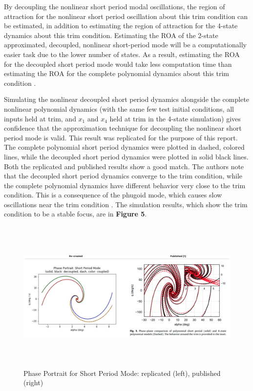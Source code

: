 \documentclass[%
 reprint,
 amsmath,amssymb,
 aps,
]{revtex4-2}
\begin{document}
By decoupling the nonlinear short period modal oscillations, the region of attraction for the nonlinear short period oscillation about this trim condition can be estimated, in addition to estimating the region of attraction for the 4-state dynamics about this trim condition. Estimating the ROA of the 2-state approximated, decoupled, nonlinear short-period mode will be a computationally easier task due to the lower number of states. As a result, estimating the ROA for the decoupled short period mode would take less computation time than estimating the ROA for the complete polynomial dynamics about this trim condition \cite{primary}.

Simulating the nonlinear decoupled short period dynamics alongside the complete nonlinear polynomial dynamics (with the same few test initial conditions, all inputs held at trim, and $x_1$ and $x_4$ held at trim in the 4-state simulation) gives confidence that the approximation technique for decoupling the nonlinear short period mode is valid. This result was replicated for the purpose of this report. The complete polynomial short period dynamics were plotted in dashed, colored lines, while the decoupled short period dynamics were plotted in solid black lines. Both the replicated and published results show a good match. The authors note that the decoupled short period dynamics converge to the trim condition, while the complete polynomial dynamics have different behavior very close to the trim condition. This is a consequence of the phugoid mode, which causes slow oscillations near the trim condition \cite{primary}. The simulation results, which show the trim condition to be a stable focus, are in \textbf{Figure 5}. 

\begin{figure}
    \centering
    \includegraphics[height=3in]{comparison.png}
    \caption{Phase Portrait for Short Period Mode: replicated (left), published (right)}
    \label{fig:comparison}
\end{figure}
\end{document}
